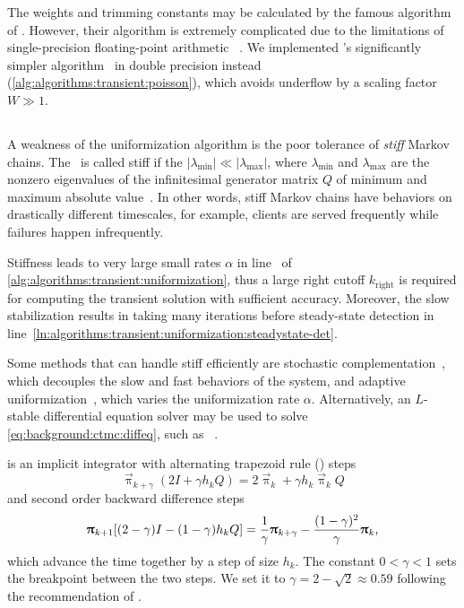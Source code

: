 The weights and trimming constants may be calculated by the famous
algorithm of \citet{DBLP:journals/cacm/FoxG88}. However, their
algorithm is extremely complicated due to the limitations of
single-precision floating-point arithmetic%
~\citep{jansen2011understanding}. We implemented
\citeauthor{DBLP:journals/corr/Burak14}'s significantly simpler
algorithm~\citep{DBLP:journals/corr/Burak14} in double precision
instead (\vref{alg:algorithms:transient:poisson}), which avoids
underflow by a scaling factor $W \gg 1$.

\subsection{}

A weakness of the uniformization algorithm is the poor tolerance of
\emph{stiff} Markov chains. The \CTMC\ is called stiff if the
$\lvert \lambda_{\min} \rvert \ll \lvert \lambda_{\max} \rvert$, where
$\lambda_{\min}$ and $\lambda_{\max}$ are the nonzero eigenvalues of
the infinitesimal generator matrix $Q$ of minimum and maximum absolute
value~\citep{DBLP:journals/cor/ReibmanT88}. In other words, stiff
Markov chains have behaviors on drastically different timescales, for
example, clients are served frequently while failures happen
infrequently.

Stiffness leads to very large small rates $\alpha$
in line~\label{ln:algorithms:transient:uniformization:alpha} of
\vref{alg:algorithms:transient:uniformization}, thus a large right
cutoff $k_{\text{right}}$ is required for computing the transient
solution with sufficient accuracy. Moreover, the slow stabilization
results in taking many iterations before steady-state detection
in line~\ref{ln:algorithms:transient:uniformization:steadystate-det}.

Some methods that can handle stiff  efficiently are
stochastic complementation~\citep{meyer1989stochastic}, which
decouples the slow and fast behaviors of the system, and adaptive
uniformization~\citep{van1994adaptive}, which varies the uniformization
rate $\alpha$. Alternatively, an $L$-stable differential equation
solver may be used to solve \vref{eq:background:ctmc:diffeq}, such as
\mbox{}~\citep{DBLP:journals/cor/ReibmanT88,%
DBLP:journals/tcad/BankCFGRS85}.

 is an implicit integrator with alternating trapezoid
rule () steps
\begin{equation}
  \vec{\uppi}_{k + \gamma} (2I + \gamma h_k Q) = 2 \vec{\uppi}_{k} +
  \gamma h_k \vec{\uppi}_k Q
\end{equation}
and second order backward difference steps
\begin{equation}
  \vec{\uppi}_{k + 1} [(2 - \gamma) I - (1 - \gamma) h_k Q] =
  \frac{1}{\gamma} \vec{\uppi}_{k + \gamma} - \frac{(1 -
    \gamma)^2}{\gamma} \vec{\uppi}_k \text,
\end{equation}
which advance the time together by a step of size $h_k$. The constant
$0 < \gamma < 1$ sets the breakpoint between the two steps. We set it
to $\gamma = 2 - \sqrt{2} \approx 0.59$ following the recommendation
of \citet{DBLP:journals/tcad/BankCFGRS85}.

